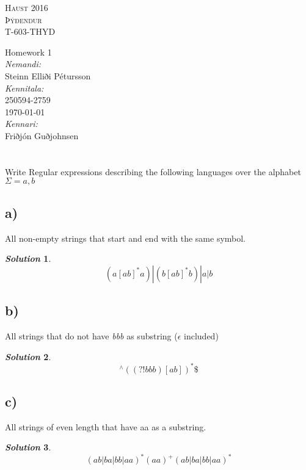 \documentclass[11pt, a4paper]{article}
\newtheorem*{solution}{\emph{Solution}}
\begin{document}
\begin{titlepage}
\begin{center}

\textsc{\huge Haust 2016}\\[1.5cm]

\textsc{\huge Þýðendur}\\[0.2cm]
\textsc{\huge T-603-THYD}\\[1.5cm]

\end{center}
{ \huge Homework 1\\[1.5cm] }
\Large {
\emph{Nemandi:}\\
Steinn Elliði Pétursson\\[0.5cm]
\emph{Kennitala:}\\
250594-2759\\[0.5cm]
{\large \today}\\[0.5cm]
\emph{Kennari:} \\
Friðjón Guðjohnsen}\\

\end{titlepage}
\leavevmode

\section{}
	Write Regular expressions describing the following languages over the alphabet $\Sigma = {a, b}$
	\subsection*{a)}
			All non-empty strings that start and end with the same symbol.
		\begin{solution}
			$$(a[ab]^{*}a)|(b[ab]^{*}b)|a|b$$
		\end{solution}
	\subsection*{b)}
			All strings that do not have \textit{bbb} as substring ($\epsilon$ included)
		\begin{solution}
			$$^\wedge((?!bbb)[ab])^*\$$$
		\end{solution}
	\subsection*{c)}
		All strings of even length that have aa as a substring.
		\begin{solution}
			$$(ab|ba|bb|aa)^*(aa)^+(ab|ba|bb|aa)^*$$
		\end{solution}
\end{document}
